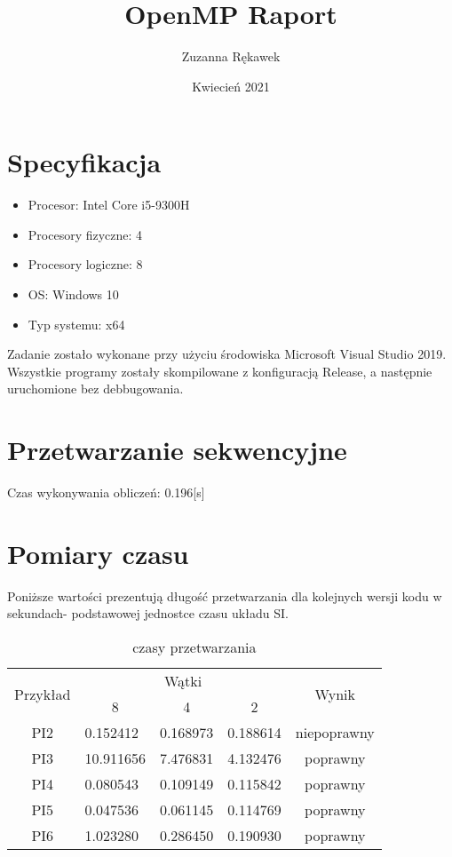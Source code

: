 \documentclass{article}
\title{OpenMP Raport}
\author{Zuzanna Rękawek}
\date{Kwiecień 2021}
\begin{document}
\maketitle

\newpage

\section{Specyfikacja}
\begin{itemize}
    \item Procesor: Intel Core i5-9300H 
    \item Procesory fizyczne: 4
    \item Procesory logiczne: 8
    \item OS: Windows 10
    \item Typ systemu: x64
\end{itemize}
Zadanie zostało wykonane przy użyciu środowiska Microsoft Visual Studio 2019. \\
Wszystkie programy zostały skompilowane z konfiguracją Release, a następnie uruchomione bez debbugowania. 

\section{Przetwarzanie sekwencyjne}
Czas wykonywania obliczeń: 0.196[s]

\section{Pomiary czasu}
Poniższe wartości prezentują długość przetwarzania dla kolejnych wersji kodu w sekundach- podstawowej jednostce czasu układu SI.
\begin{table}[!htb]
\centering
\begin{tabular}{|c|l|l|l|c|}
\hline
\multirow{2}{*}{Przykład} & \multicolumn{3}{c|}{Wątki}                                               & \multirow{2}{*}{Wynik} \\ \cline{2-4}
                      & \multicolumn{1}{c|}{8} & \multicolumn{1}{c|}{4} & \multicolumn{1}{c|}{2} &                        \\ \hline
PI2                   & 0.152412               & 0.168973               & 0.188614               & niepoprawny            \\ \hline
PI3                   & 10.911656              & 7.476831               & 4.132476               & poprawny               \\ \hline
PI4                   & 0.080543               & 0.109149               & 0.115842               & poprawny               \\ \hline
PI5                   & 0.047536               & 0.061145               & 0.114769               & poprawny               \\ \hline
PI6                   & 1.023280               & 0.286450               & 0.190930               & poprawny               \\ \hline
\end{tabular}
\caption{czasy przetwarzania}
\end{table}
\end{document}
